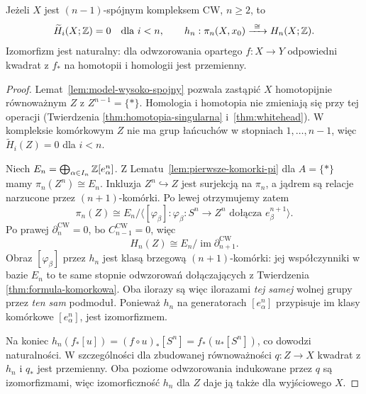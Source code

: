 \begin{twierdzenie}
\label{thm:hurewicz-wyzszy}
Jeżeli $X$ jest
$(n-1)$-spójnym
kompleksem CW,
$n\geq2$, to
\[
 \widetilde H_i(X;\mathbb{Z})=0
 \quad\text{dla }i<n,
 \qquad
 h_n:\pi_n(X,x_0)
 \xrightarrow{\ \cong\ }H_n(X;\mathbb{Z}).
\]
Izomorfizm jest naturalny:
dla odwzorowania opartego
$f:X\to Y$ odpowiedni
kwadrat z $f_*$ na
homotopii i homologii
jest przemienny.
\end{twierdzenie}
\begin{proof}
Lemat~\ref{lem:model-wysoko-spojny}
pozwala zastąpić
$X$ homotopijnie
równoważnym $Z$
z $Z^{n-1}=\{*\}$.
Homologia i homotopia
nie zmieniają się
przy tej operacji
(Twierdzenia
\ref{thm:homotopia-singularna}
i~\ref{thm:whitehead}).
W kompleksie komórkowym
$Z$ nie ma grup
łańcuchów w
stopniach $1,\ldots,n-1$,
więc
$\widetilde H_i(Z)=0$
dla $i<n$.

Niech
$E_n=\bigoplus_{\alpha\in I_n}
\mathbb{Z}[e_\alpha^n]$.
Z Lematu~\ref{lem:pierwsze-komorki-pi}
dla $A=\{*\}$ mamy
$\pi_n(Z^n)\cong E_n$.
Inkluzja
$Z^n\hookrightarrow Z$
jest surjekcją
na $\pi_n$,
a jądrem są relacje
narzucone przez
$(n+1)$-komórki.
Po lewej otrzymujemy
zatem
\[
 \pi_n(Z)
 \cong
 E_n/\langle
   [\varphi_\beta]:
   \varphi_\beta:S^n\to Z^n
   \text{ dołącza }e_\beta^{n+1}
 \rangle.
\]
Po prawej
$\partial_n^{\mathrm{CW}}=0$,
bo $C_{n-1}^{\mathrm{CW}}=0$,
więc
\[
 H_n(Z)
 \cong E_n/
     \operatorname{im}
       \partial_{n+1}^{\mathrm{CW}}.
\]
Obraz $[\varphi_\beta]$
przez $h_n$ jest
klasą brzegową
$(n+1)$-komórki:
jej współczynniki
w bazie $E_n$
to te same stopnie
odwzorowań dołączających
z Twierdzenia
\ref{thm:formula-komorkowa}.
Oba ilorazy są
więc ilorazami
\emph{tej samej}
wolnej grupy przez
\emph{ten sam}
podmoduł.
Ponieważ $h_n$
na generatorach
$[e_\alpha^n]$
przypisuje im
klasy komórkowe
$[e_\alpha^n]$,
jest izomorfizmem.

Na koniec
$h_n(f_*[u])
=(f\circ u)_*[S^n]
=f_*(u_*[S^n])$,
co dowodzi
naturalności.
W szczególności dla zbudowanej równoważności $q:Z\to X$
kwadrat z $h_n$ i $q_*$ jest przemienny. Oba poziome odwzorowania
indukowane przez $q$ są izomorfizmami, więc izomorficzność
$h_n$ dla $Z$ daje ją także dla wyjściowego $X$.
\end{proof}

